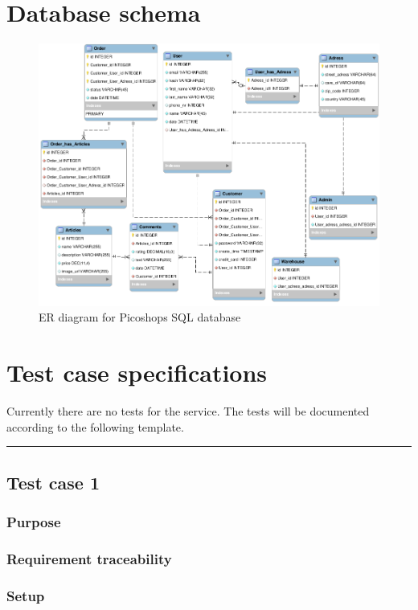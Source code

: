 \documentclass{article}
\newcommand{\ruler}{\noindent\rule{\textwidth}{1pt}}
\begin{document}
\section{Database schema}
\begin{figure}[H]
    \centering
    \includegraphics[width=16cm]{picoshop-sql-er-diagram-rev3.png}
    \caption{ER diagram for Picoshops SQL database}
    \label{fig:er-diagram}
\end{figure}

\newpage
\section{Test case specifications}

Currently there are no tests for the service. The tests will be documented according to the following template.

\bigskip
\ruler
\subsection{Test case 1}
\subsubsection*{Purpose}
\subsubsection*{Requirement traceability}
\subsubsection*{Setup}
\end{document}
